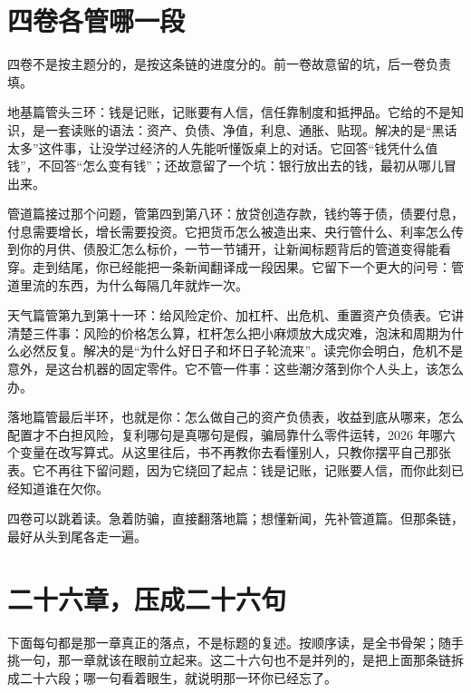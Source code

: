 \section{四卷各管哪一段}

四卷不是按主题分的，是按这条链的进度分的。前一卷故意留的坑，后一卷负责填。

地基篇管头三环：钱是记账，记账要有人信，信任靠制度和抵押品。它给的不是知识，是一套读账的语法：资产、负债、净值，利息、通胀、贴现。解决的是“黑话太多”这件事，让没学过经济的人先能听懂饭桌上的对话。它回答“钱凭什么值钱”，不回答“怎么变有钱”；还故意留了一个坑：银行放出去的钱，最初从哪儿冒出来。

管道篇接过那个问题，管第四到第八环：放贷创造存款，钱约等于债，债要付息，付息需要增长，增长需要投资。它把货币怎么被造出来、央行管什么、利率怎么传到你的月供、债股汇怎么标价，一节一节铺开，让新闻标题背后的管道变得能看穿。走到结尾，你已经能把一条新闻翻译成一段因果。它留下一个更大的问号：管道里流的东西，为什么每隔几年就炸一次。

天气篇管第九到第十一环：给风险定价、加杠杆、出危机、重置资产负债表。它讲清楚三件事：风险的价格怎么算，杠杆怎么把小麻烦放大成灾难，泡沫和周期为什么必然反复。解决的是“为什么好日子和坏日子轮流来”。读完你会明白，危机不是意外，是这台机器的固定零件。它不管一件事：这些潮汐落到你个人头上，该怎么办。

落地篇管最后半环，也就是你：怎么做自己的资产负债表，收益到底从哪来，怎么配置才不白担风险，复利哪句是真哪句是假，骗局靠什么零件运转，2026 年哪六个变量在改写算式。从这里往后，书不再教你去看懂别人，只教你摆平自己那张表。它不再往下留问题，因为它绕回了起点：钱是记账，记账要人信，而你此刻已经知道谁在欠你。

四卷可以跳着读。急着防骗，直接翻落地篇；想懂新闻，先补管道篇。但那条链，最好从头到尾各走一遍。

\section{二十六章，压成二十六句}

下面每句都是那一章真正的落点，不是标题的复述。按顺序读，是全书骨架；随手挑一句，那一章就该在眼前立起来。这二十六句也不是并列的，是把上面那条链拆成二十六段；哪一句看着眼生，就说明那一环你已经忘了。

